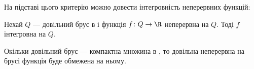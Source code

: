 На підставі цього критерію можно довести інтегровність неперервних функ\-цій:
\begin{theorem}
Нехай $Q$ --- довільний брус в  і функція ${f\colon Q\to\R}$ неперервна на $Q$. Тоді $f$ інтегровна на $Q$.
\end{theorem}
\begin{remark}
Окільки довільний брус --- компактна множина в , то довільна неперервна на брусі функція буде обмежена на ньому.
\end{remark}
